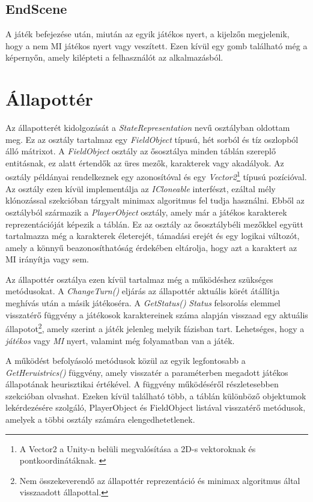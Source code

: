 \documentclass[
]{thesis-ekf}
\theoremstyle{definition}
\theoremstyle{remark}
\begin{document}
\subsection{EndScene}

A játék befejezése után, miután az egyik játékos nyert, a kijelzőn megjelenik, hogy a nem MI játékos nyert vagy veszített. Ezen kívül egy gomb található még a képernyőn, amely kilépteti a felhasználót az alkalmazásból.

\section{Állapottér} \label{state}

Az állapotterét kidolgozását a \emph{StateRepresentation} nevű osztályban oldottam meg. Ez az osztály tartalmaz egy \emph{FieldObject} típusú, hét sorból és tíz oszlopból álló mátrixot. A \emph{FieldObject} osztály az ősosztálya minden táblán szereplő entitásnak, ez alatt értendők az üres mezők, karakterek vagy akadályok. Az osztály példányai rendelkeznek egy azonosítóval és egy \emph{Vector2}\footnote{A Vector2 a Unity-n belüli megvalósítása a 2D-s vektoroknak és pontkoordinátáknak. \cite{UnityDocsVector2}} típusú pozícióval. Az osztály ezen kívül implementálja az \emph{ICloneable} interfészt, ezáltal mély klónozással  szekcióban tárgyalt minimax algoritmus fel tudja használni. Ebből az osztályból származik a \emph{PlayerObject} osztály, amely már a játékos karakterek reprezentációját képezik a táblán. Ez az osztály az ősosztálybéli mezőkkel együtt tartalmazza még a karakterek életerejét, támadási erejét és egy logikai változót, amely a könnyű beazonosíthatóság érdekében eltárolja, hogy azt a karaktert az MI irányítja vagy sem.

Az állapottér osztálya ezen kívül tartalmaz még a működéshez szükséges metódusokat. A \emph{ChangeTurn()} eljárás az állapottér aktuális körét átállítja meghívás után a másik játékoséra. A \emph{GetStatus()} \emph{Status} felsorolás elemmel visszatérő függvény a játékosok karaktereinek száma alapján visszaad egy aktuális állapotot\footnote{Nem összekeverendő az állapottér reprezentáció és minimax algoritmus által visszaadott állapottal.}, amely szerint a játék jelenleg melyik fázisban tart. Lehetséges, hogy a \emph{játékos} vagy \emph{MI} nyert, valamint még folyamatban van a játék.

A működést befolyásoló metódusok közül az egyik legfontosabb a \emph{GetHeruistrics()} függvény, amely visszatér a paraméterben megadott játékos állapotának heurisztikai értékével. A függvény működéséről részletesebben  szekcióban olvashat. Ezeken kívül található több, a táblán különböző objektumok lekérdezésére szolgáló, PlayerObject és FieldObject listával visszatérő metódusok, amelyek a többi osztály számára elengedhetetlenek.
\end{document}
